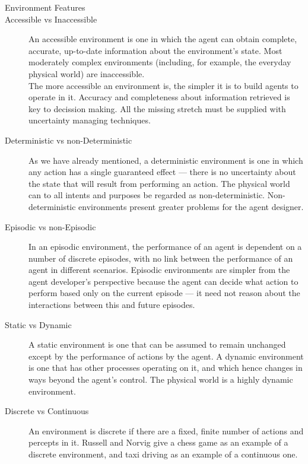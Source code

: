 \documentclass{report}
\begin{document}


\begin{description} 
	\item [Environment Features]
	\item [Accessible vs Inaccessible] An accessible environment is one in which the agent
		can obtain complete, accurate, up-to-date information about the environment’s state.
		Most moderately complex environments (including, for example, the everyday physical 
		world) are inaccessible.\\
		The more accessible an environment is, the simpler it is to build agents to operate in it.
		Accuracy and completeness about information retrieved is key to decission making.
		All the missing stretch must be supplied with uncertainty managing techniques.
	\item [Deterministic vs non-Deterministic] As we have already mentioned, a deterministic
		environment is one in which any action has a single guaranteed effect — there is no 
		uncertainty about the state that will result from performing an action.
		The physical world can to all intents and purposes be regarded as non-deterministic.
		Non-deterministic environments present greater problems for the agent designer.
	\item [Episodic vs non-Episodic] In an episodic environment, the performance of an
		agent is dependent on a number of discrete episodes, with no link between the performance
		of an agent in different scenarios. Episodic environments are simpler from the agent
		developer’s perspective because the agent can decide what action to perform based only 
		on the current episode — it need not reason about the interactions between this and future 
		episodes.
	\item [Static vs Dynamic] A static environment is one that can be assumed to remain unchanged 
		except by the performance of actions by the agent. A dynamic environment is one that has 
		other processes operating on it, and which hence changes in ways beyond the agent’s control.
		The physical world is a highly dynamic environment.
	\item [Discrete vs Continuous] An environment is discrete if there are a fixed, finite
		number of actions and percepts in it. Russell and Norvig give a chess game as 
		an example of a discrete environment, and taxi driving as an example of a continuous one.
\end{description}
\end{document}
